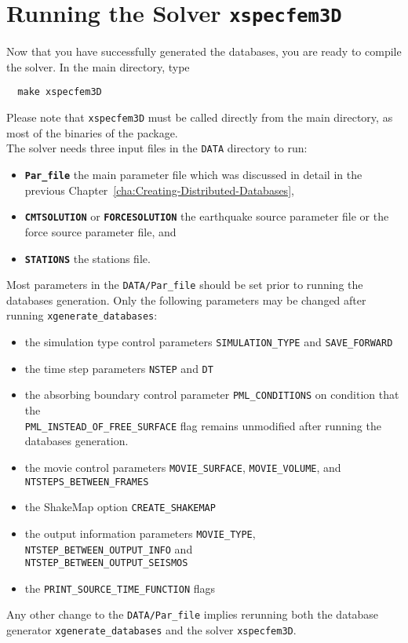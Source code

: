 \chapter{Running the Solver \texttt{xspecfem3D}}\label{cha:Running-the-Solver}

Now that you have successfully generated the databases, you are ready
to compile the solver. In the main directory, type
{\small
\begin{verbatim}
  make xspecfem3D
\end{verbatim}
}
\noindent
Please note that \texttt{xspecfem3D} must be called directly from
the main directory, as most of the binaries of the package.\\

\noindent
The solver needs three input files in the \texttt{DATA} directory
to run:
\begin{itemize}
\item {\bf \texttt{Par\_file}} the main parameter file which was discussed
in detail in the previous Chapter~\ref{cha:Creating-Distributed-Databases},
\item {\bf \texttt{CMTSOLUTION}} or {\bf \texttt{FORCESOLUTION}} the earthquake
source parameter file or the force source parameter file, and
\item {\bf \texttt{STATIONS}} the stations file.
\end{itemize}

\noindent
Most parameters in the \texttt{DATA/Par\_file} should be set prior to running
the databases generation. Only the following parameters may be changed
after running \texttt{xgenerate\_databases}:
\begin{itemize}
\item the simulation type control parameters \texttt{SIMULATION\_TYPE}
and \texttt{SAVE\_FORWARD}
\item the time step parameters \texttt{NSTEP} and \texttt{DT}
\item the absorbing boundary control parameter \texttt{PML\_CONDITIONS}
on condition that the\\
 \texttt{PML\_INSTEAD\_OF\_FREE\_SURFACE} flag remains unmodified
after running the databases generation.
\item the movie control parameters \texttt{MOVIE\_SURFACE}, \texttt{MOVIE\_VOLUME},
and \texttt{NTSTEPS\_BETWEEN\_FRAMES}
\item the ShakeMap\textregistered{} option \texttt{CREATE\_SHAKEMAP}
\item the output information parameters \texttt{MOVIE\_TYPE}, \texttt{NTSTEP\_BETWEEN\_OUTPUT\_INFO} and\\
\texttt{NTSTEP\_BETWEEN\_OUTPUT\_SEISMOS}
\item the \texttt{PRINT\_SOURCE\_TIME\_FUNCTION} flags
\end{itemize}
Any other change to the \texttt{DATA/Par\_file} implies rerunning both
the database generator \texttt{xgenerate\_databases} and the solver
\texttt{xspecfem3D}.\\


